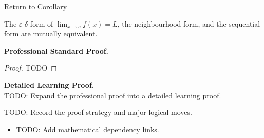 \newpage
{}
\label{prf:limit-three-equiv}

\begin{remark*}[Return]
\hyperref[cor:limit-three-equiv]{Return to Corollary}
\end{remark*}

\begin{corollary*}
The $\varepsilon$-$\delta$ form of $\lim_{x\to c}f(x)=L$, the neighbourhood form, and the sequential form are mutually equivalent.
\end{corollary*}

\textbf{Professional Standard Proof.}~\\
\begin{proof}
TODO
\end{proof}

\textbf{Detailed Learning Proof.}~\\
TODO: Expand the professional proof into a detailed learning proof.

\begin{remark*}
TODO: Record the proof strategy and major logical moves.
\end{remark*}

\begin{dependencies}
\begin{itemize}
  \item TODO: Add mathematical dependency links.
\end{itemize}
\end{dependencies}
